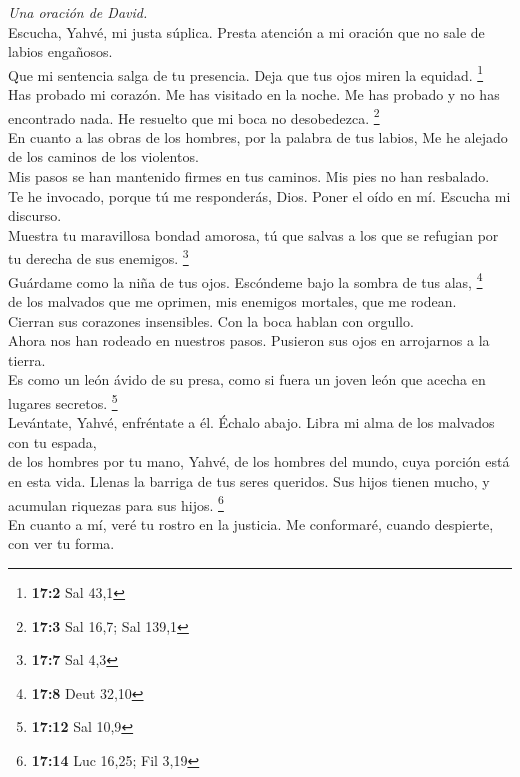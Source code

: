 \emph{Una oración de David.}\\
 Escucha, Yahvé, mi justa súplica. Presta atención a mi
oración que no sale de labios engañosos.\\
 Que mi sentencia salga de tu presencia. Deja que tus ojos
miren la equidad. \footnote{\textbf{17:2} Sal 43,1}\\
 Has probado mi corazón. Me has visitado en la noche. Me
has probado y no has encontrado nada. He resuelto que mi boca no
desobedezca. \footnote{\textbf{17:3} Sal 16,7; Sal 139,1}\\
 En cuanto a las obras de los hombres, por la palabra de
tus labios, Me he alejado de los caminos de los violentos.\\
 Mis pasos se han mantenido firmes en tus caminos. Mis
pies no han resbalado.\\
 Te he invocado, porque tú me responderás, Dios. Poner el
oído en mí. Escucha mi discurso.\\
 Muestra tu maravillosa bondad amorosa, tú que salvas a
los que se refugian por tu derecha de sus enemigos. \footnote{\textbf{17:7}
  Sal 4,3}\\
 Guárdame como la niña de tus ojos. Escóndeme bajo la
sombra de tus alas, \footnote{\textbf{17:8} Deut 32,10}\\
 de los malvados que me oprimen, mis enemigos mortales,
que me rodean.\\
 Cierran sus corazones insensibles. Con la boca hablan
con orgullo.\\
 Ahora nos han rodeado en nuestros pasos. Pusieron sus
ojos en arrojarnos a la tierra.\\
 Es como un león ávido de su presa, como si fuera un
joven león que acecha en lugares secretos. \footnote{\textbf{17:12} Sal
  10,9}\\
 Levántate, Yahvé, enfréntate a él. Échalo abajo. Libra
mi alma de los malvados con tu espada,\\
 de los hombres por tu mano, Yahvé, de los hombres del
mundo, cuya porción está en esta vida. Llenas la barriga de tus seres
queridos. Sus hijos tienen mucho, y acumulan riquezas para sus hijos.
\footnote{\textbf{17:14} Luc 16,25; Fil 3,19}\\
 En cuanto a mí, veré tu rostro en la justicia. Me
conformaré, cuando despierte, con ver tu forma.

